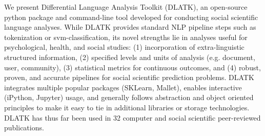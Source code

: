 We present Differential Language Analysis Toolkit (DLATK), an open-source python package and command-line tool developed for conducting social scientific language analyses. While DLATK provides standard NLP pipeline steps such as tokenization or svm-classification, its novel strengths lie in analyses useful for psychological, health, and social studies: (1) incorporation of extra-linguistic structured information, (2) specified levels and units of analysis (e.g. document, user, community), (3) statistical metrics for continuous outcomes, and (4) robust, proven, and accurate pipelines for social scientific prediction problems. DLATK integrates multiple popular packages (SKLearn, Mallet), enables interactive (iPython, Jupyter) usage, and generally follows abstraction and object oriented principles to make it easy to tie in additional libraries or storage technologies. DLATK has thus far been used in 32 computer and social scientific peer-reviewed publications.
